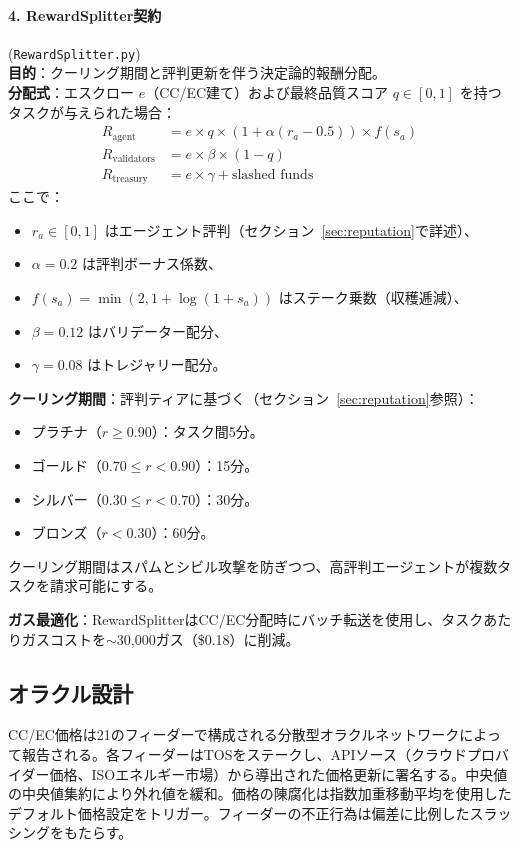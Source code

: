 \documentclass[11pt]{article}
\begin{document}
\paragraph{4. RewardSplitter契約} (\texttt{RewardSplitter.py})\\
\textbf{目的}：クーリング期間と評判更新を伴う決定論的報酬分配。\\
\textbf{分配式}：エスクロー $e$（CC/EC建て）および最終品質スコア $q \in [0,1]$ を持つタスクが与えられた場合：
\begin{align}
R_{\text{agent}} &= e \times q \times \left(1 + \alpha (r_a - 0.5)\right) \times f(s_a) \label{eq:reward-agent} \\
R_{\text{validators}} &= e \times \beta \times (1-q) \label{eq:reward-validators} \\
R_{\text{treasury}} &= e \times \gamma + \text{slashed funds} \label{eq:reward-treasury}
\end{align}
ここで：
\begin{itemize}[noitemsep]
  \item $r_a \in [0,1]$ はエージェント評判（セクション~\ref{sec:reputation}で詳述）、
  \item $\alpha = 0.2$ は評判ボーナス係数、
  \item $f(s_a) = \min(2, 1 + \log(1+s_a))$ はステーク乗数（収穫逓減）、
  \item $\beta = 0.12$ はバリデーター配分、
  \item $\gamma = 0.08$ はトレジャリー配分。
\end{itemize}
\textbf{クーリング期間}：評判ティアに基づく（セクション~\ref{sec:reputation}参照）：
\begin{itemize}[noitemsep]
  \item プラチナ（$r \geq 0.90$）：タスク間5分。
  \item ゴールド（$0.70 \leq r < 0.90$）：15分。
  \item シルバー（$0.30 \leq r < 0.70$）：30分。
  \item ブロンズ（$r < 0.30$）：60分。
\end{itemize}
クーリング期間はスパムとシビル攻撃を防ぎつつ、高評判エージェントが複数タスクを請求可能にする。

\textbf{ガス最適化}：RewardSplitterはCC/EC分配時にバッチ転送を使用し、タスクあたりガスコストを$\sim$30,000ガス（\$0.18）に削減。

\subsection{オラクル設計}
CC/EC価格は21のフィーダーで構成される分散型オラクルネットワークによって報告される。各フィーダーはTOSをステークし、APIソース（クラウドプロバイダー価格、ISOエネルギー市場）から導出された価格更新に署名する。中央値の中央値集約により外れ値を緩和。価格の陳腐化は指数加重移動平均を使用したデフォルト価格設定をトリガー。フィーダーの不正行為は偏差に比例したスラッシングをもたらす。
\end{document}
